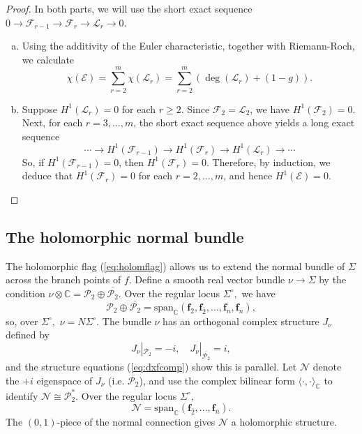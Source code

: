 \documentclass[11pt]{article}
\theoremstyle{definition}
\newcommand{\C}{\mathbb{C}}
\numberwithin{equation}{section}
\begin{document}
\begin{proof} In both parts, we will use the short exact sequence $0 \to \mathcal{F}_{r-1} \to \mathcal{F}_r \to \mathcal{L}_r \to 0$.
	\begin{enumerate}[(a)]
		\item Using the additivity of the Euler characteristic, together with Riemann-Roch, we calculate
		      $$\chi(\mathcal{E}) = \sum_{r = 2}^m \chi(\mathcal{L}_r) = \sum_{r = 2}^m \left( \deg(\mathcal{L}_r) + (1-g) \right)\!.$$
		\item Suppose $H^1(\mathcal{L}_r) = 0$ for each $r \geq 2$. Since $\mathcal{F}_2 = \mathcal{L}_2$, we have $H^1(\mathcal{F}_2) = 0$. Next, for each $r = 3, \ldots, m$, the short exact sequence above yields a long exact sequence
		      $$\cdots \to H^1(\mathcal{F}_{r-1}) \to H^1(\mathcal{F}_r) \to H^1(\mathcal{L}_r) \to \cdots$$
		      So, if $H^1(\mathcal{F}_{r-1}) = 0$, then $H^1(\mathcal{F}_r) = 0$. Therefore, by induction, we deduce that $H^1(\mathcal{F}_r) = 0$ for each $r = 2, \ldots, m$, and hence $H^1(\mathcal{E}) = 0$. \qedhere
	\end{enumerate}
\end{proof}

\subsection{The holomorphic normal bundle}

\indent \indent  The holomorphic flag (\ref{eq:holomflag}) allows us to extend the normal bundle of $\Sigma$ across the branch points of $f$. Define a smooth real vector bundle $\nu \to \Sigma$ by the condition $\nu \otimes \C = \mathcal{P}_2 \oplus \overline{\mathcal{P}_2}.$ Over the regular locus $\Sigma^\circ,$ we have
\begin{equation*}
	\mathcal{P}_2 \oplus \overline{\mathcal{P}_2} = \mathrm{span}_\C(\mathbf{f}_2, \mathbf{f}_{\overline{2}}, \ldots, \mathbf{f}_n, \mathbf{f}_{\overline{n}}),
\end{equation*}
so, over $\Sigma^\circ,$ $\nu = N \Sigma^\circ.$ The bundle $\nu$ has an orthogonal complex structure $J_\nu$ defined by
\begin{equation*}
	J_{\nu}|_{\mathcal{P}_2} =  -i , \quad J_{\nu}|_{\overline{\mathcal{P}_2}} =  i,
\end{equation*}
and the structure equations (\ref{eq:dxfcomp}) show this is parallel. Let $\mathcal{N}$ denote the $+i$ eigenspace of $J_\nu$ (i.e. $\overline{\mathcal{P}_2}$), and use the complex bilinear form $\langle \cdot, \cdot \rangle_\C$ to identify $\mathcal{N} \cong \mathcal{P}_2^*.$ Over the regular locus $\Sigma^\circ,$
\begin{equation*}
	\mathcal{N} = \mathrm{span}_\C(\mathbf{f}_{\overline{2}}, \ldots, \mathbf{f}_{\overline{n}}).
\end{equation*}
The $(0,1)$-piece of the normal connection gives $\mathcal{N}$ a holomorphic structure. 
\end{document}
